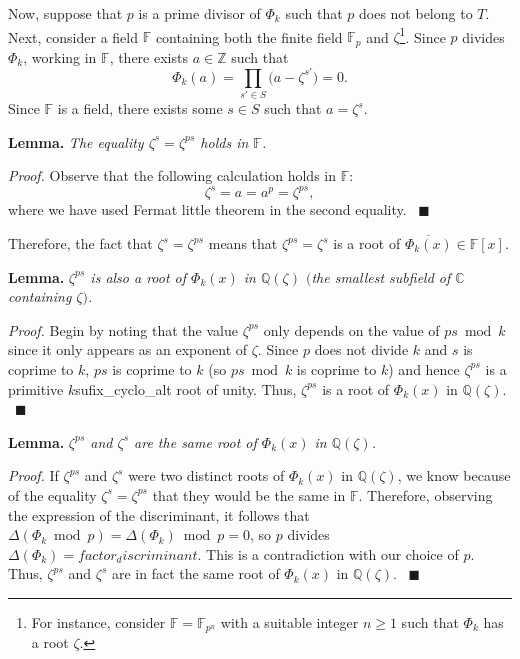 \documentclass[a4paper, 12pt]{article}
\theoremstyle{definition}
\newcommand{\Z}{\mathbb{Z}}
\newcommand{\Q}{\mathbb{Q}}
\newcommand{\C}{\mathbb{C}}
\newcommand{\F}{\mathbb{F}}
\begin{document}
Now, suppose that $p$ is a prime divisor of $\Phi_{{k}}$ such that $p$ does not belong to $T$. Next, consider a field $\F$ containing both the finite field $\F_p$ and $\zeta$\footnote{For instance, consider $\F=\F_{p^n}$ with a suitable integer $n\geqslant 1$ such that $\Phi_{{k}}$ has a root $\zeta$.}. Since $p$ divides $\Phi_{{k}}$, working in $\F$, there exists $a\in\Z$ such that 
\begin{equation*}
\Phi_{{k}}(a)=\prod_{s'\in S}\big(a-\zeta^{s'}\big)=0.
\end{equation*}
Since $\F$ is a field, there exists some $s\in S$ such that $a=\zeta^{s}$.

\textbf{Lemma.} \emph{The equality $\zeta^s=\zeta^{ps}$ holds in $\F$.}

\textit{Proof.} Observe that the following calculation holds in $\F$:
\begin{equation*}\label{eq:reproots}
\zeta^{s}=a=a^p=\zeta^{ps},
\end{equation*}
where we have used Fermat little theorem in the second equality. \ $\blacksquare$ 

Therefore, the fact that $\zeta^{s}=\zeta^{ps}$ means that $\zeta^{ps}=\zeta^{s}$ is a root of $\overline{\Phi_{{k}}(x)}\in\F[x]$. 

\textbf{Lemma.} \emph{$\zeta^{ps}$ is also a root of $\Phi_{{k}}(x)$ in $\Q(\zeta)$ $($the smallest subfield of $\C$ containing $\zeta)$.}

\textit{Proof.} Begin by noting that the value $\zeta^{ps}$ only depends on the value of $ps \bmod{{k}}$ since it only appears as an exponent of $\zeta$. Since $p$ does not divide ${k}$ and $s$ is coprime to ${k}$, $ps$ is coprime to ${k}$ (so $ps \bmod{{k}}$ is coprime to ${k}$) and hence $\zeta^{ps}$ is a primitive ${k}${sufix_cyclo_alt} root of unity. Thus, $\zeta^{ps}$ is a root of $\Phi_{{k}}(x)$ in $\Q(\zeta)$. \ $\blacksquare$

\textbf{Lemma.} \emph{$\zeta^{ps}$ and $\zeta^{s}$ are the same root of $\Phi_{{k}}(x)$ in $\Q(\zeta)$.}

\textit{Proof.} If $\zeta^{ps}$ and $\zeta^{s}$ were two distinct roots of $\Phi_{{k}}(x)$ in $\Q(\zeta)$, we know because of the equality $\zeta^{s}=\zeta^{ps}$ that they would be the same in $\F$. Therefore, observing the expression of the discriminant, it follows that $\Delta(\Phi_{{k}} \bmod{p})=\Delta(\Phi_{{k}}) \bmod{p}=0$, so $p$ divides $\Delta(\Phi_{{k}})={factor_discriminant}$. This is a contradiction with our choice of $p$. Thus, $\zeta^{ps}$ and $\zeta^{s}$ are in fact the same root of $\Phi_{{k}}(x)$ in $\Q(\zeta)$. \ $\blacksquare$
\end{document}
